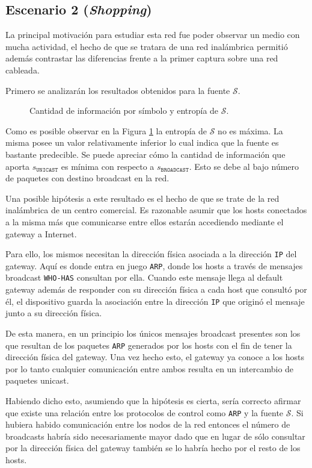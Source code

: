 \subsection{Escenario 2 (\emph{Shopping})}

La principal motivación para estudiar esta red fue poder observar un medio con
mucha actividad, el hecho de que se tratara de una red inalámbrica permitió además
contrastar las diferencias frente a la primer captura sobre una red cableada.

Primero se analizarán los resultados obtenidos para la fuente $\mathcal{S}$.

\begin{figure}[h]
	\caption{Cantidad de información por símbolo y entropía de $\mathcal{S}$.}
    \label{res:esc2:fig1}
\end{figure}


Como es posible observar en la Figura \ref{res:esc2:fig1} la entropía de
$\mathcal{S}$ no es máxima. La misma posee un valor relativamente inferior lo
cual indica que la fuente es bastante predecible. Se puede apreciar cómo la
cantidad de información que aporta $s_{\texttt{UNICAST}}$ es mínima con respecto
a $s_{\texttt{BROADCAST}}$. Esto se debe al bajo número de paquetes con destino
broadcast en la red.

Una posible hipótesis a este resultado es el hecho de que se trate de la red
inalámbrica de un centro comercial. Es razonable asumir que los hosts conectados
a la misma más que comunicarse entre ellos estarán accediendo mediante el
gateway a Internet.

Para ello, los mismos necesitan la dirección física asociada a la dirección
\texttt{IP} del gateway. Aquí es donde entra en juego \texttt{ARP}, donde los
hosts a través de mensajes broadcast \texttt{WHO-HAS} consultan por ella. Cuando
este mensaje llega al default gateway además de responder con su dirección
física a cada host que consultó por él, el dispositivo guarda la asociación
entre la dirección \texttt{IP} que originó el mensaje junto a su dirección física.

De esta manera, en un principio los únicos mensajes broadcast presentes son los
que resultan de los paquetes \texttt{ARP} generados por los hosts con el fin de
tener la dirección física del gateway. Una vez hecho esto, el gateway ya conoce
a los hosts por lo tanto cualquier comunicación entre ambos resulta en un
intercambio de paquetes unicast.

Habiendo dicho esto, asumiendo que la hipótesis es cierta, sería correcto
afirmar que existe una relación entre los protocolos de control como
\texttt{ARP} y la fuente $\mathcal{S}$. Si hubiera habido comunicación entre los
nodos de la red entonces el número de broadcasts habría sido necesariamente
mayor dado que en lugar de sólo consultar por la dirección física del gateway
también se lo habría hecho por el resto de los hosts.

